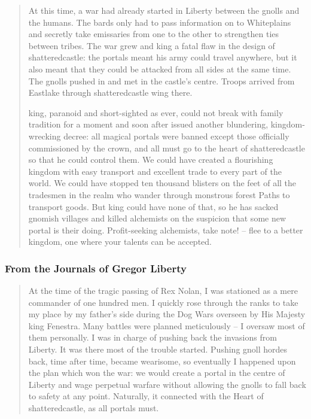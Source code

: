 \begin{multicols}{2}
\begin{quotation}
	At this time, a war had already started in Liberty between the gnolls and the humans.
	The bards only had to pass information on to Whiteplains and secretly take emissaries from one to the other to strengthen ties between tribes.
	The war grew and \gls{king} a fatal flaw in the design of \gls{shatteredcastle}: the portals meant his army could travel anywhere, but it also meant that they could be attacked from all sides at the same time.
	The gnolls pushed in and met in the castle's centre.
	Troops arrived from Eastlake through \gls{shatteredcastle} wing there.

	\Gls{king}, paranoid and short-sighted as ever, could not break with family tradition for a moment and soon after issued another blundering, kingdom-wrecking decree: all magical portals were banned except those officially commissioned by the crown, and all must go to the heart of \gls{shatteredcastle} so that he could control them.
	We could have created a flourishing kingdom with easy transport and excellent trade to every part of the world.
	We could have stopped ten thousand blisters on the feet of all the tradesmen in the realm who wander through monstrous forest Paths to transport goods.
	But \gls{king} could have none of that, so he has sacked gnomish villages and killed alchemists on the suspicion that some new portal is their doing.
	Profit-seeking alchemists, take note! -- flee to a better kingdom, one where your talents can be accepted.

\end{quotation}

\subsubsection{From the Journals of Gregor Liberty}


\begin{quotation}

	At the time of the tragic passing of Rex Nolan, I was stationed as a mere commander of one hundred men.
	I quickly rose through the ranks to take my place by my father's side during the Dog Wars overseen by His Majesty \gls{king} Fenestra.
	Many battles were planned meticulously -- I oversaw most of them personally.
	I was in charge of pushing back the invasions from Liberty.
	It was there most of the trouble started.
	Pushing gnoll hordes back, time after time, became wearisome, so eventually I happened upon the plan which won the war: we would create a portal in the centre of Liberty and wage perpetual warfare without allowing the gnolls to fall back to safety at any point.
	Naturally, it connected with the Heart of \gls{shatteredcastle}, as all portals must.


\end{quotation}
\end{multicols}

